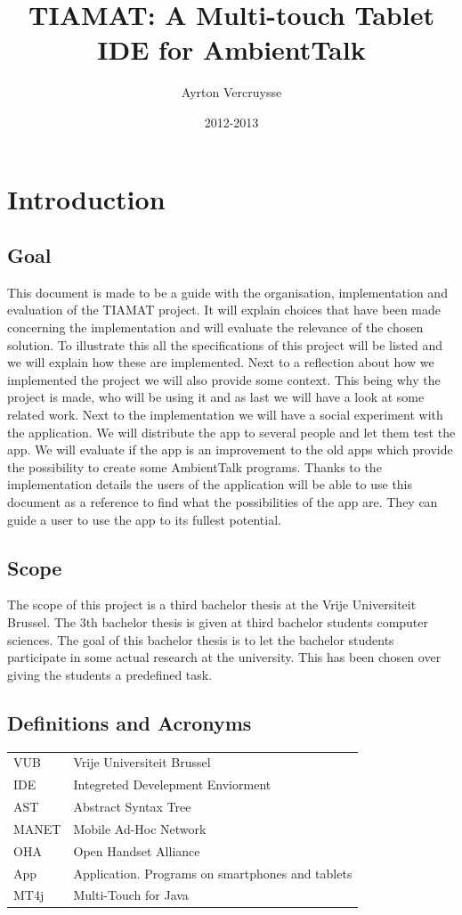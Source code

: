 \documentclass[a4paper,12pt]{report}
\author{Ayrton Vercruysse}
\title{TIAMAT: A Multi-touch Tablet IDE for AmbientTalk}
\date{2012-2013}
\begin{document}
\maketitlepage
\tableofcontents
\chapter{Introduction}
\section{Goal}
This document is made to be a guide with the organisation, implementation and evaluation of the TIAMAT project. It will explain choices that have been made concerning the implementation and will evaluate
the relevance of the chosen solution. To illustrate this all the specifications of this project will be listed and we will explain how these are implemented.
Next to a reflection about how we implemented the project we will also provide some context. This being why the project is made, who will be using it and as last we will have a look at some 
related work.
Next to the implementation we will have a social experiment with the application. We will distribute the app to several people and let them test the app. We will evaluate if the app is an 
improvement to the old apps which provide the possibility to create some AmbientTalk programs. 
Thanks to the implementation details the users of the application will be able to use this document as a reference to find what the possibilities of the app are. They can guide a user to use the
app to its fullest potential.

\section{Scope}
The scope of this project is a third bachelor thesis at the Vrije Universiteit Brussel. The 3th bachelor thesis is given at third bachelor students computer sciences. The goal of this bachelor thesis
is to let the bachelor students  participate in some actual research at the university. This has been chosen over giving the students a predefined task.
\section{Definitions and Acronyms}

\begin{tabular}{ l l }
  VUB & Vrije Universiteit Brussel \\
  IDE & Integreted Develepment Enviorment \\
  AST & Abstract Syntax Tree \\
  MANET 	& Mobile Ad-Hoc Network \\
  OHA & Open Handset Alliance \\
  App & Application. Programs on smartphones and tablets \\
  MT4j & Multi-Touch for Java \\
\end{tabular}
\end{document}
